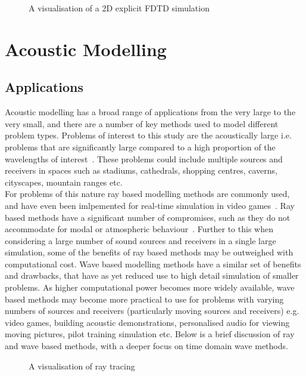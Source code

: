 \documentclass{svproc}
\begin{document}
\begin{figure}
\centering
\centering
\caption{A visualisation of a 2D explicit FDTD simulation ~\cite{Durbridge2016a}}
\end{figure}


\section{Acoustic Modelling}
\subsection{Applications}
Acoustic modelling has a broad range of applications from the very large to the very small, and there are a number of key methods used to model different problem types. Problems of interest to this study are the acoustically large i.e. problems that are significantly large compared to a high proportion of the wavelengths of interest~\cite{Everest2009}. These problems could include multiple sources and receivers in spaces such as stadiums, cathedrals, shopping centres, caverns, cityscapes, mountain ranges etc.\\ For problems of this nature ray based modelling methods are commonly used, and have even been imlpemented for real-time simulation in video games~\cite{Bengtsson2009}. Ray based methods have a significant number of compromises, such as they do not accommodate for modal or atmospheric behaviour~\cite{Elorza2005}. Further to this when considering a large number of sound sources and receivers in a single large simulation, some of the benefits of ray based methods may be outweighed with computational cost. Wave based modelling methods have a similar set of benefits and drawbacks, that have as yet reduced use to high detail simulation of smaller problems. As higher computational power becomes more widely available, wave based methods may become more practical to use for problems with varying numbers of sources and receivers (particularly moving sources and receivers) e.g. video games, building acoustic demonstrations, personalised audio for viewing moving pictures, pilot training simulation etc. Below is a brief discussion of ray and wave based methods, with a deeper focus on time domain wave methods.
\begin{figure}
\centering
\centering
\caption{A visualisation of ray tracing~\cite{Rober2007}}
\end{figure} 
\end{document}
